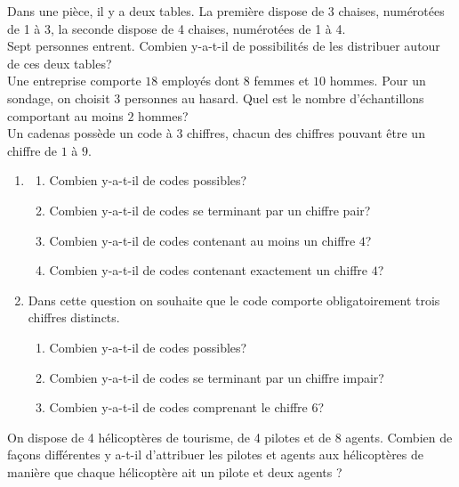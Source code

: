 \documentclass[../PolyS4.tex]{subfiles}
\begin{document}



\vskip0.2cm
Dans une pièce, il y a deux tables. La première dispose de 3 chaises, numérotées de 1 à 3, la seconde dispose de 4 chaises, numérotées de 1 à 4.\\
Sept personnes entrent. Combien y-a-t-il de possibilités de les distribuer autour de ces deux tables?\\





\vskip0.2cm
Une entreprise comporte $18$ employés dont $8$ femmes et $10$ hommes. Pour un sondage, on choisit $3$ personnes au hasard. Quel est le nombre d'échantillons comportant au moins $2$ hommes?\\



\vskip0.2cm
Un cadenas possède un code à $3$ chiffres, chacun des chiffres pouvant être un chiffre de $1$ à $9$.
\begin{enumerate}
\item
\begin{enumerate}
\item Combien y-a-t-il de codes possibles?
\item Combien y-a-t-il de codes se terminant par un chiffre pair?
\item Combien y-a-t-il de codes contenant au moins un chiffre $4$?
\item Combien y-a-t-il de codes contenant exactement un chiffre $4$?
\end{enumerate}
\item Dans cette question on souhaite que le code comporte obligatoirement trois chiffres distincts.
\begin{enumerate}
\item Combien y-a-t-il de codes possibles?
\item Combien y-a-t-il de codes se terminant par un chiffre impair?
\item Combien y-a-t-il de codes comprenant le chiffre $6$?\\
\end{enumerate}
\end{enumerate}




\vskip0.2cm
On dispose de 4 hélicoptères de tourisme, de 4 pilotes et de 8 agents. Combien de façons différentes y a-t-il d'attribuer les pilotes et agents aux hélicoptères de manière que chaque hélicoptère ait un pilote et deux agents ?\\
\end{document}
